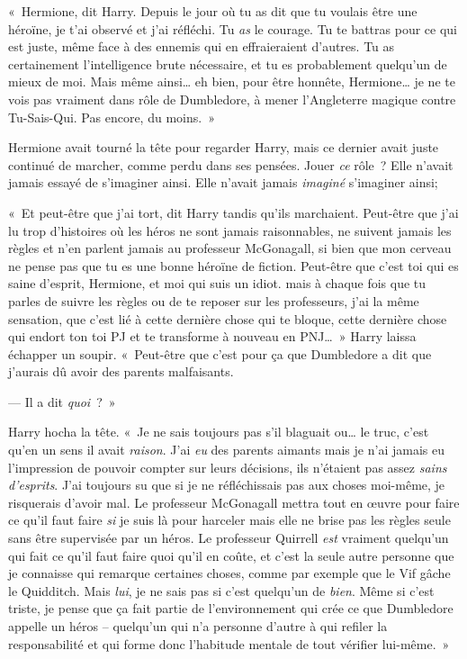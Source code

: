 «~Hermione, dit Harry. Depuis le jour où tu as dit que tu voulais être une héroïne, je t'ai observé et j'ai réfléchi. Tu \emph{as} le courage. Tu te battras pour ce qui est juste, même face à des ennemis qui en effraieraient d'autres. Tu as certainement l'intelligence brute nécessaire, et tu es probablement quelqu'un de mieux de moi. Mais même ainsi… eh bien, pour être honnête, Hermione… je ne te vois pas vraiment dans rôle de Dumbledore, à mener l'Angleterre magique contre Tu-Sais-Qui. Pas encore, du moins.~»

Hermione avait tourné la tête pour regarder Harry, mais ce dernier avait juste continué de marcher, comme perdu dans ses pensées. Jouer \emph{ce} rôle~? Elle n'avait jamais essayé de s'imaginer ainsi. Elle n'avait jamais \emph{imaginé} s'imaginer ainsi;

«~Et peut-être que j'ai tort, dit Harry tandis qu'ils marchaient. Peut-être que j'ai lu trop d'histoires où les héros ne sont jamais raisonnables, ne suivent jamais les règles et n'en parlent jamais au professeur McGonagall, si bien que mon cerveau ne pense pas que tu es une bonne héroïne de fiction. Peut-être que c'est toi qui es saine d'esprit, Hermione, et moi qui suis un idiot. mais à chaque fois que tu parles de suivre les règles ou de te reposer sur les professeurs, j'ai la même sensation, que c'est lié à cette dernière chose qui te bloque, cette dernière chose qui endort ton toi PJ et te transforme à nouveau en PNJ…~» Harry laissa échapper un soupir. «~Peut-être que c'est pour ça que Dumbledore a dit que j'aurais dû avoir des parents malfaisants.

--- Il a dit \emph{quoi}~?~»

Harry hocha la tête. «~Je ne sais toujours pas s'il blaguait ou… le truc, c'est qu'en un sens il avait \emph{raison}. J'ai \emph{eu} des parents aimants mais je n'ai jamais eu l'impression de pouvoir compter sur leurs décisions, ils n'étaient pas assez \emph{sains d'esprits}. J'ai toujours su que si je ne réfléchissais pas aux choses moi-même, je risquerais d'avoir mal. Le professeur McGonagall mettra tout en œuvre pour faire ce qu'il faut faire \emph{si} je suis là pour harceler mais elle ne brise pas les règles seule sans être supervisée par un héros. Le professeur Quirrell \emph{est} vraiment quelqu'un qui fait ce qu'il faut faire quoi qu'il en coûte, et c'est la seule autre personne que je connaisse qui remarque certaines choses, comme par exemple que le Vif gâche le Quidditch. Mais \emph{lui}, je ne sais pas si c'est quelqu'un de \emph{bien}. Même si c'est triste, je pense que ça fait partie de l'environnement qui crée ce que Dumbledore appelle un héros -- quelqu'un qui n'a personne d'autre à qui refiler la responsabilité et qui forme donc l'habitude mentale de tout vérifier lui-même.~»

